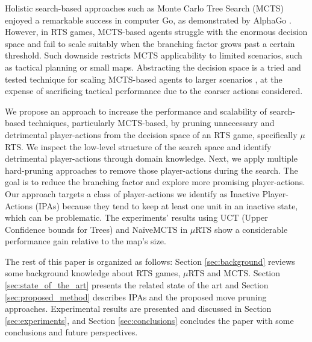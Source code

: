 \documentclass[conference]{IEEEtran}
\newcommand{\mRTS}{$\mu$RTS}
\begin{document}
Holistic search-based approaches such as Monte Carlo Tree Search (MCTS) \cite{browne_survey_2012} enjoyed a remarkable success in computer Go, as demonstrated by AlphaGo \cite{silver_mastering_2016}.
 However, in RTS games, MCTS-based agents struggle with the enormous decision space and fail to scale suitably when the branching factor grows past a certain threshold. Such downside restricts MCTS applicability to limited scenarios, such as tactical planning or small maps. Abstracting the decision space is a tried and tested technique for scaling MCTS-based agents to larger scenarios \cite{ontanon_survey_2013}, 
at the expense of sacrificing tactical performance due to the coarser actions considered.

We propose an approach to increase the performance and scalability of search-based techniques, particularly MCTS-based, by pruning unnecessary and detrimental player-actions from the decision space of an RTS game, specifically \mRTS{}.
We inspect the low-level structure of the search space and identify detrimental player-actions through domain knowledge. Next, we apply multiple hard-pruning approaches to remove those player-actions during the search. The goal is to reduce the branching factor and explore more promising player-actions. Our approach targets a class of player-actions we identify as Inactive Player-Actions (IPAs) because they tend to keep at least one unit in an inactive state, which can be problematic. The experiments' results using UCT (Upper Confidence bounds for Trees) and NaïveMCTS in \mRTS{} show a considerable performance gain relative to the map's size.

 

The rest of this paper is organized as follows: Section \ref{sec:background} reviews some background knowledge about RTS games, \mRTS{} and MCTS. Section \ref{sec:state_of_the_art} presents the related state of the art and Section \ref{sec:proposed_method} describes IPAs and the proposed move pruning approaches. Experimental results are presented and discussed in Section \ref{sec:experiments}, and Section \ref{sec:conclusions} concludes the paper with some conclusions and future perspectives.
\end{document}
